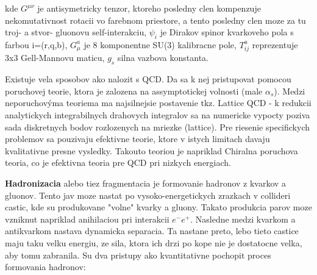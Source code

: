 \documentclass[../../main.tex]{subfiles}
\begin{document}
kde $G^{\mu\nu}$ je antisymetricky tenzor, ktoreho posledny clen kompenzuje nekomutativnost rotacii vo farebnom priestore, a tento posledny clen moze za tu troj- a stvor- gluonovu self-interakciu, $\psi_i$ je Dirakov spinor kvarkoveho pola s farbou i=(r,q,b), $G_{\mu}^a$ je 8 komponentne SU(3) kalibracne pole, $T_{ij}^a$ reprezentuje 3x3 Gell-Mannovu maticu, $g_s$ silna vazbova konstanta.\par
Existuje vela sposobov ako nalozit s QCD. Da sa k nej pristupovat pomocou poruchovej teorie, ktora je zalozena na assymptotickej volnosti (male $\alpha_s$). Medzi neporuchovýma teoriema ma najsilnejsie postavenie tkz. Lattice QCD - k redukcii analytickych integrabilnych drahovych integralov sa na numericke vypocty poziva sada diskretnych bodov rozlozenych na mriezke (lattice). Pre riesenie specifickych problemov sa pouzivaju efektivne teorie, ktore v istych limitach davaju kvalitativne presne vysledky. Takouto teoriou je napriklad Chiralna poruchova teoria, co je efektivna teoria pre QCD pri nizkych energiach.\par
\textbf{Hadronizacia} alebo tiez fragmentacia je formovanie hadronov z kvarkov a gluonov. Tento jav moze nastat po vysoko-energetickych zrazkach v collideri castic, kde su produkovane "volne" kvarky a gluony. Takato produkcia parov moze vzniknut napriklad anihilaciou pri interakcii $e^-e^+$. Nasledne medzi kvarkom a antikvarkom nastava dynamicka separacia. Ta nastane preto, lebo tieto castice maju taku velku energiu, ze sila, ktora ich drzi po kope nie je dostatocne velka, aby tomu zabranila. Su dva pristupy ako kvantitativne pochopit proces formovania hadronov: 
\end{document}
